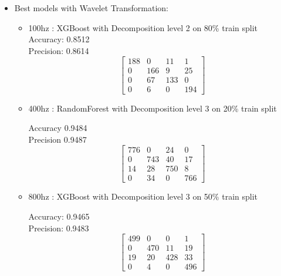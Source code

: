 \documentclass{article}
\begin{document}
\begin{itemize}
\begin{itemize}
        \end{itemize}
        \item Best models with Wavelet Transformation:
        \begin{itemize}
            \item 100hz : XGBoost with Decomposition level 2 on 80\% train split
            \\
            Accuracy: 0.8512
            \\
            Precision: 0.8614
            \[
            \begin{bmatrix}
            188 & 0   & 11  & 1 \\
            0   & 166 & 9   & 25 \\
            0   & 67  & 133 & 0 \\
            0   & 6   & 0   & 194
            \end{bmatrix}
            \]

            
            \item 400hz : RandomForest with Decomposition level 3 on 20\% train split

            Accuracy  0.9484
            \\
            Precision 0.9487
            \\
            \[
            \begin{bmatrix}
            776 & 0   & 24  & 0 \\
            0   & 743 & 40  & 17 \\
            14  & 28  & 750 & 8 \\
            0   & 34  & 0   & 766
            \end{bmatrix}
            \]


            \item 800hz : XGBoost with Decomposition level 3 on 50\% train split
                
            Accuracy: 0.9465
            \\
            Precision: 0.9483
            \\
            \[
            \begin{bmatrix}
            499 & 0   & 0   & 1 \\
            0   & 470 & 11  & 19 \\
            19  & 20  & 428 & 33 \\
            0   & 4   & 0   & 496
            \end{bmatrix}
            \]
            
        \end{itemize}
    
\end{itemize}
\end{document}
